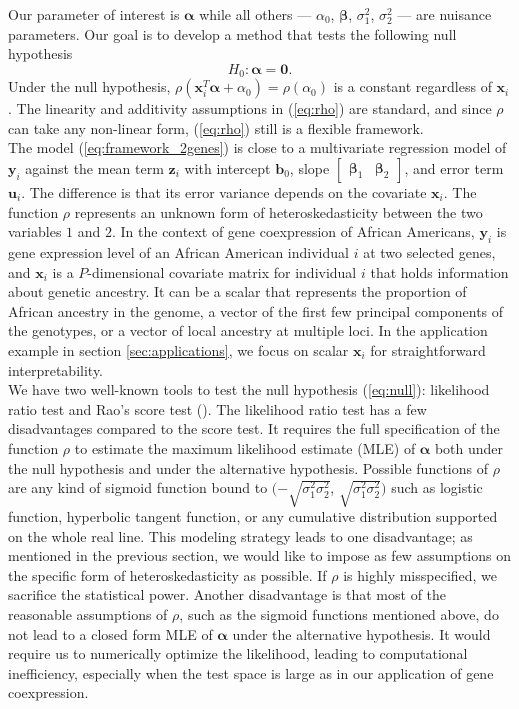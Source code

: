 \documentclass[aoas,authoryear, preprint]{imsart}
\numberwithin{equation}{section}
\theoremstyle{plain}
\begin{document}
Our parameter of interest is $\bm{\alpha}$ while all others --- $\alpha_0$, $\bm{\beta}$, $\sigma_1^2$, $\sigma_2^2$ --- are nuisance parameters. Our goal is to develop a method that tests the following null hypothesis
\begin{equation}
    H_0: \bm{\alpha} = \bm{0}.
    \label{eq:null}
\end{equation}
Under the null hypothesis, $\rho(\bm{x}_i^T\bm{\alpha} + \alpha_0) = \rho(\alpha_0)$ is a constant regardless of $\bm{x}_i$. The linearity and additivity assumptions in (\ref{eq:rho}) are standard, and since $\rho$ can take any non-linear form, (\ref{eq:rho}) still is a flexible framework.\\

The model (\ref{eq:framework_2genes}) is close to a multivariate regression model of $\bm{y}_i$ against the mean term $\bm{z}_i$ with intercept $\bm{b}_0$, slope $\begin{bmatrix} \bm{\beta}_1 & \bm{\beta}_2 \end{bmatrix}$, and error term $\bm{u}_i$. The difference is that its error variance depends on the covariate $\bm{x}_i$. The function $\rho$ represents an unknown form of heteroskedasticity between the two variables $1$ and $2$. In the context of gene coexpression of African Americans, $\bm{y}_i$ is gene expression level of an African American individual $i$ at two selected genes, and $\bm{x}_i$ is a $P$-dimensional covariate matrix for individual $i$ that holds information about genetic ancestry. It can be a scalar that represents the proportion of African ancestry in the genome, a vector of the first few principal components of the genotypes, or a vector of local ancestry at multiple loci. In the application example in section \ref{sec:applications}, we focus on scalar $\bm{x}_i$ for straightforward interpretability. \\

We have two well-known tools to test the null hypothesis (\ref{eq:null}): likelihood ratio test and Rao's score test (\cite{breusch1979simple}). The likelihood ratio test has a few disadvantages compared to the score test. It requires the full specification of the function $\rho$ to estimate the maximum likelihood estimate (MLE) of $\bm{\alpha}$ both under the null hypothesis and under the alternative hypothesis. Possible functions of $\rho$ are any kind of sigmoid function bound to $(-\sqrt{\sigma_1^2\sigma_2^2}$, $\sqrt{\sigma_1^2\sigma_2^2})$ such as logistic function, hyperbolic tangent function, or any cumulative distribution supported on the whole real line. This modeling strategy leads to one disadvantage; as mentioned in the previous section, we would like to impose as few assumptions on the specific form of heteroskedasticity as possible. If $\rho$ is highly misspecified, we sacrifice the statistical power. Another disadvantage is that most of the reasonable assumptions of $\rho$, such as the sigmoid functions mentioned above, do not lead to a closed form MLE of $\bm{\alpha}$ under the alternative hypothesis. It would require us to numerically optimize the likelihood, leading to computational inefficiency, especially when the test space is large as in our application of gene coexpression. \\
\end{document}
